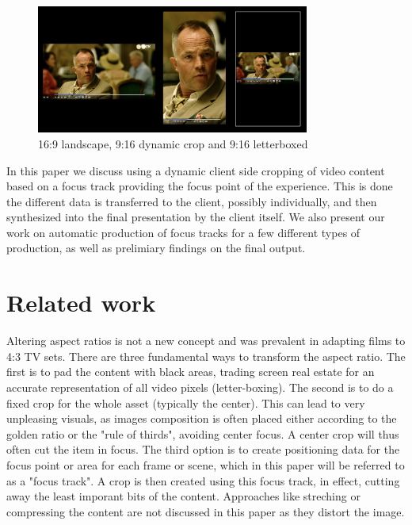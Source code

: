\documentclass[sigconf, review=true]{acmart}
\begin{document}
\begin{figure}
  \begin{center}
    \includegraphics[width=0.8\textwidth]{DAR_vs_letterbox.png}
  \end{center}
  \caption{16:9 landscape, 9:16 dynamic crop and 9:16 letterboxed}
  \label{croppings}
\end{figure}

In this paper we discuss using a dynamic client side cropping of video content
based on a focus track providing the focus point of the experience. This is
done the different data is transferred to the client, possibly individually,
and then synthesized into the final presentation by the client itself. We
also present our work on automatic production of focus tracks for a few
different types of production, as well as prelimiary findings on the final
output.

\section{Related work}

Altering aspect ratios is not a new concept and was prevalent in adapting
films to 4:3 TV sets. There are three fundamental ways to transform the
aspect ratio. The first is to pad the content with black areas, trading
screen real estate for an accurate representation of all video pixels
(letter-boxing). The second is to do a fixed crop for the whole asset
(typically the center). This can lead to very unpleasing visuals, as images
composition is often placed either according to the golden ratio or the "rule
of thirds", avoiding center focus. A center crop will thus often cut the item
in focus. The third option is to create positioning data for the focus point
or area for each frame or scene, which in this paper will be referred to as
a "focus track". A crop is then created using this focus track, in effect,
cutting away the least imporant bits of the content. Approaches like
streching or compressing the content are not discussed in this paper as they
distort the image.
\end{document}
